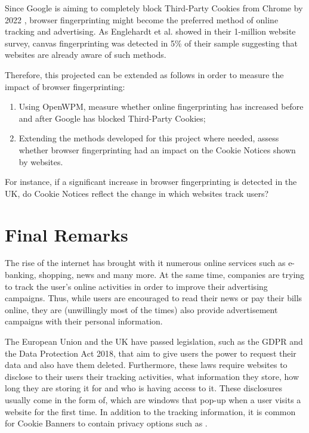\documentclass[../main.tex]{subfiles}
\begin{document}
Since Google is aiming to completely block Third-Party Cookies from Chrome by 2022 \cite{bohn_2020}, browser fingerprinting might become the preferred method of online tracking and advertising. As Englehardt et al. \cite{englehardt2016online} showed in their 1-million website survey, canvas fingerprinting was detected in 5\% of their sample suggesting that websites are already aware of such methods. 

Therefore, this projected can be extended as follows in order to measure the impact of browser fingerprinting:

\begin{enumerate}
    \item Using OpenWPM, measure whether online fingerprinting has increased before and after Google has blocked Third-Party Cookies;

    \item Extending the methods developed for this project where needed, assess whether browser fingerprinting had an impact on the Cookie Notices shown by websites.
\end{enumerate}

For instance, if a significant increase in browser fingerprinting is detected in the UK, do Cookie Notices reflect the change in which websites track users? 

\section{Final Remarks}
The rise of the internet has brought with it numerous online services such as e-banking, shopping, news and many more. At the same time, companies are trying to track the user’s online activities in order to improve their advertising campaigns. Thus, while users are encouraged to read their news or pay their bills online, they are (unwillingly most of the times) also provide advertisement campaigns with their personal information. 

The European Union and the UK have passed legislation, such as the GDPR and the Data Protection Act 2018, that aim to give users the power to request their data and also have them deleted. Furthermore, these laws require websites to disclose to their users their tracking activities, what information they store, how long they are storing it for and who is having access to it. These disclosures usually come in the form of, which are windows that pop-up when a user visits a website for the first time. In addition to the tracking information, it is common for Cookie Banners to contain privacy options such as . 
\end{document}
